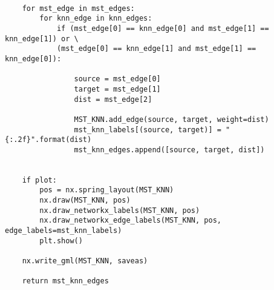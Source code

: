\documentclass[11pt, a4paper]{article}
\begin{document}
\begin{verbatim}
    
    for mst_edge in mst_edges:
        for knn_edge in knn_edges:
            if (mst_edge[0] == knn_edge[0] and mst_edge[1] == knn_edge[1]) or \
            (mst_edge[0] == knn_edge[1] and mst_edge[1] == knn_edge[0]):
                
                source = mst_edge[0]
                target = mst_edge[1]
                dist = mst_edge[2]
                
                MST_KNN.add_edge(source, target, weight=dist)
                mst_knn_labels[(source, target)] = "{:.2f}".format(dist)
                mst_knn_edges.append([source, target, dist])


    if plot:
        pos = nx.spring_layout(MST_KNN)
        nx.draw(MST_KNN, pos)
        nx.draw_networkx_labels(MST_KNN, pos)
        nx.draw_networkx_edge_labels(MST_KNN, pos, edge_labels=mst_knn_labels)  
        plt.show()

    nx.write_gml(MST_KNN, saveas)
    
    return mst_knn_edges
\end{verbatim}
\end{document}
